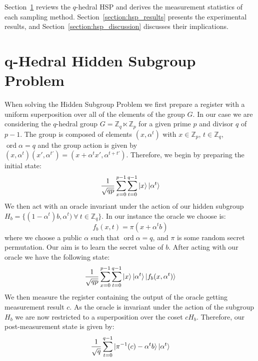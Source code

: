  Section~\ref{section:theory} reviews the $q$-hedral HSP and derives the measurement statistics of each sampling method.  Section~\ref{section:hsp_results} presents the experimental results, and Section~\ref{section:hsp_discussion} discusses their implications. 

\section{q-Hedral Hidden Subgroup Problem}
\label{section:theory}
When solving the Hidden Subgroup Problem we first prepare a register with a uniform superposition over all of the elements of the group $G$. In our case we are considering the $q$-hedral group $G= \mathbb{Z}_q \ltimes \mathbb{Z}_p$ for a given prime $p$ and divisor $q$ of $p-1$. The group is composed of elements $(x,\alpha^t)$ with $x \in \mathbb{Z}_p$, $t \in \mathbb{Z}_q$, $\operatorname{ord}\alpha = q$ and the group action is given by $(x,\alpha^t)(x',\alpha^{t'}) = (x+\alpha^tx', \alpha^{t+t'})$. Therefore, we begin by preparing the initial state:
\begin{equation}
    \frac{1}{\sqrt{qp}}\sum_{x = 0}^{p-1}\sum_{t=0}^{q-1} \ket{x}\ket{\alpha^t}
    \label{eq:initialstate}
\end{equation}
We then act with an oracle invariant under the action of our hidden subgroup $H_b = \{(1-\alpha^t)b, \alpha^t) \>\forall\> t \in \mathbb{Z}_q\}$. In our instance the oracle we choose is:
\begin{equation}
    f_b(x,t) = \pi(x + \alpha^t b)
\end{equation}
where we choose a public $\alpha$ such that $\operatorname{ord}\alpha = q$, and $\pi$ is some random secret permutation. Our aim is to learn the secret value of $b$. After acting with our oracle we have the following state:
\begin{equation}
        \frac{1}{\sqrt{qp}}\sum_{x = 0}^{p-1}\sum_{t=0}^{q-1} \ket{x}\ket{\alpha^t}\ket{f_b(x,\alpha^t)}
\end{equation}
We then measure the register containing the output of the oracle getting measurement result $c$. As the oracle is invariant under the action of the subgroup $H_b$ we are now restricted to a superposition over the coset $cH_b$. Therefore, our post-measurement state is given by:
\begin{equation}
    \frac{1}{\sqrt{q}} \sum_{t=0}^{q-1}\ket{\pi^{-1}(c) - \alpha^tb}\ket{\alpha^t}
\end{equation}

